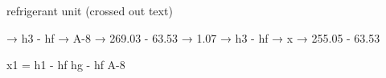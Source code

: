 refrigerant unit (crossed out text)  

→ h3 - hf → A-8 → 269.03 - 63.53 → 1.07  
→ h3 - hf → x → 255.05 - 63.53  

x1 = h1 - hf  
hg - hf  
A-8